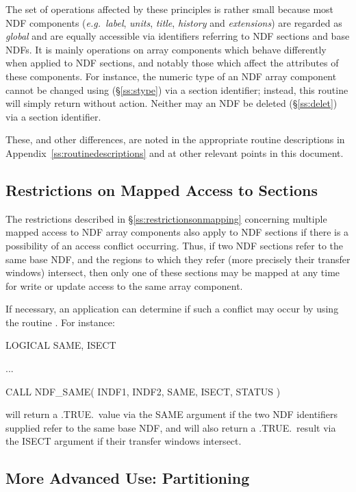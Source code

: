 \documentclass[twoside,11pt,nolof]{starlink}
\providecommand{\st}[1]{{\emph{#1}}}
\begin{document}
The set of operations affected by these principles is rather small because
most NDF components (\st{e.g.}\ \st{label}, \st{units}, \st{title},
\st{history\/} and \st{extensions\/}) are regarded as \st{global\/}
and are equally
accessible via identifiers referring to NDF sections and base NDFs.
It is mainly operations on array components which behave differently when
applied to NDF sections, and notably those which affect the attributes of
these components.
For instance, the numeric type of an NDF array component cannot be changed
using  (\S\ref{ss:stype}) via a section identifier; instead, this
routine will simply return without action.
Neither may an NDF be deleted (\S\ref{ss:delet}) via a section identifier.

These, and other differences, are noted in the appropriate routine
descriptions in Appendix~\ref{ss:routinedescriptions} and at other relevant
points in this document.

\subsection{Restrictions on Mapped Access to Sections}

The restrictions described in \S\ref{ss:restrictionsonmapping} concerning
multiple mapped access to NDF array components also apply to NDF sections if
there is a possibility of an access conflict occurring.
Thus, if two NDF sections refer to the same base NDF, and the regions to
which they refer (more precisely their transfer windows) intersect, then only
one of these sections may be mapped at any time for write or update access
to the same array component.

If necessary, an application can determine if such a conflict may occur by
using the routine .
For instance:

\small
\begin{terminalv}
      LOGICAL SAME, ISECT

      ...

      CALL NDF_SAME( INDF1, INDF2, SAME, ISECT, STATUS )
\end{terminalv}
\normalsize

will return a .TRUE.\ value via the SAME argument if the two NDF identifiers
supplied refer to the same base NDF, and will also return a .TRUE.\ result
via the ISECT argument if their transfer windows intersect.

\subsection{\label{ss:partitioning}More Advanced Use: Partitioning}
\end{document}
